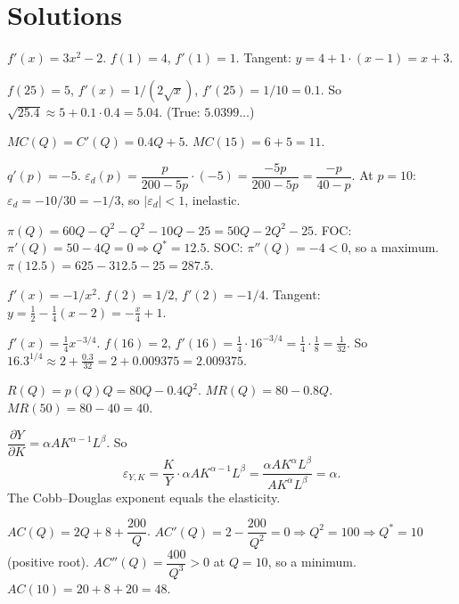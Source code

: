 \section{Solutions}

\begin{solutions}
  \item $f'(x)=3x^2-2$. $f(1)=4$, $f'(1)=1$. Tangent:
        $y=4+1\cdot(x-1)=x+3$.

  \item $f(25)=5$, $f'(x)=1/(2\sqrt{x})$, $f'(25)=1/10=0.1$. So
        $\sqrt{25.4}\approx 5+0.1\cdot0.4=5.04$. (True: $5.0399\ldots$)

  \item $MC(Q)=C'(Q)=0.4Q+5$. $MC(15)=6+5=11$.

  \item $q'(p)=-5$.
        $\varepsilon_d(p)=\dfrac{p}{200-5p}\cdot(-5)=\dfrac{-5p}{200-5p}
        =\dfrac{-p}{40-p}$. At $p=10$: $\varepsilon_d=-10/30=-1/3$, so
        $|\varepsilon_d|<1$, inelastic.

  \item $\pi(Q)=60Q-Q^2-Q^2-10Q-25=50Q-2Q^2-25$. FOC:
        $\pi'(Q)=50-4Q=0\Rightarrow Q^*=12.5$. SOC: $\pi''(Q)=-4<0$, so a
        maximum. $\pi(12.5)=625-312.5-25=287.5$.

  \item $f'(x)=-1/x^2$. $f(2)=1/2$, $f'(2)=-1/4$. Tangent:
        $y=\frac12-\frac14(x-2)=-\frac{x}{4}+1$.

  \item $f'(x)=\frac14x^{-3/4}$. $f(16)=2$,
        $f'(16)=\frac14\cdot16^{-3/4}=\frac14\cdot\frac18=\frac1{32}$. So
        $16.3^{1/4}\approx2+\frac{0.3}{32}=2+0.009375=2.009375$.

  \item $R(Q)=p(Q)Q=80Q-0.4Q^2$. $MR(Q)=80-0.8Q$. $MR(50)=80-40=40$.

  \item $\dfrac{\partial Y}{\partial K}=\alpha AK^{\alpha-1}L^\beta$. So
        \[
          \varepsilon_{Y,K}=\frac{K}{Y}\cdot\alpha AK^{\alpha-1}L^\beta
            =\frac{\alpha AK^\alpha L^\beta}{AK^\alpha L^\beta}=\alpha .
        \]
        The Cobb--Douglas exponent equals the elasticity.

  \item $AC(Q)=2Q+8+\dfrac{200}{Q}$.
        $AC'(Q)=2-\dfrac{200}{Q^2}=0\Rightarrow Q^2=100\Rightarrow Q^*=10$
        (positive root). $AC''(Q)=\dfrac{400}{Q^3}>0$ at $Q=10$, so a
        minimum. $AC(10)=20+8+20=48$.


\end{solutions}
